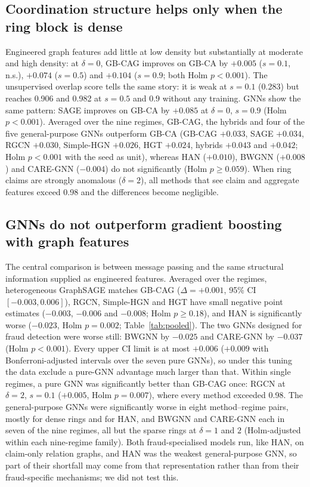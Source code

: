 \documentclass[pdflatex,sn-vancouver-num]{sn-jnl}
\begin{document}
\subsection{Coordination structure helps only when the ring block is dense}
Engineered graph features add little at low density but substantially at
moderate and high density: at $\delta=0$, GB-CAG improves on GB-CA by
$+0.005$ ($s=0.1$, n.s.), $+0.074$ ($s=0.5$) and $+0.104$ ($s=0.9$; both Holm
$p<0.001$). The unsupervised overlap score tells the same story: it is weak
at $s=0.1$ (0.283) but reaches 0.906 and 0.982 at $s=0.5$ and $0.9$ without
any training. GNNs show the same pattern: SAGE improves on GB-CA by
$+0.085$ at $\delta=0$, $s=0.9$ (Holm $p<0.001$). Averaged over the nine
regimes, GB-CAG, the hybrids and four of the five general-purpose GNNs
outperform GB-CA (GB-CAG $+0.033$, SAGE $+0.034$, RGCN $+0.030$, Simple-HGN
$+0.026$, HGT $+0.024$, hybrids $+0.043$ and $+0.042$; Holm $p<0.001$ with
the seed as unit), whereas HAN ($+0.010$), BWGNN ($+0.008$) and CARE-GNN
($-0.004$) do not significantly (Holm $p\ge0.059$).
When ring claims are strongly anomalous
($\delta=2$), all methods that see claim and aggregate features exceed 0.98
and the differences become negligible.

\subsection{GNNs do not outperform gradient boosting with graph features}
The central comparison is between message passing and the same structural
information supplied as engineered features. Averaged over the regimes,
heterogeneous GraphSAGE matches GB-CAG ($\Delta=+0.001$, 95\% CI
$[-0.003, 0.006]$), RGCN, Simple-HGN and HGT have small negative point
estimates ($-0.003$, $-0.006$ and $-0.008$; Holm $p\ge0.18$), and HAN is
significantly worse ($-0.023$, Holm $p=0.002$; Table~\ref{tab:pooled}). The
two GNNs designed for fraud detection were worse still: BWGNN by $-0.025$
and CARE-GNN by $-0.037$ (Holm $p<0.001$). Every upper CI limit is at most
$+0.006$ ($+0.009$ with Bonferroni-adjusted intervals over the seven pure GNNs),
so under this tuning the data exclude a pure-GNN advantage much larger than
that. Within
single regimes, a pure GNN was significantly better than GB-CAG once: RGCN
at $\delta=2$, $s=0.1$ ($+0.005$, Holm $p=0.007$), where every method
exceeded 0.98. The general-purpose GNNs were significantly worse in eight
method--regime pairs, mostly for dense rings and for HAN, and BWGNN and
CARE-GNN each in seven of the nine regimes, all but the sparse rings at
$\delta=1$ and $2$ (Holm-adjusted within each nine-regime family). Both
fraud-specialised models run, like HAN, on claim-only relation graphs, and
HAN was the weakest general-purpose GNN, so part of their shortfall may come
from that representation rather than from their fraud-specific mechanisms;
we did not test this.
\end{document}
